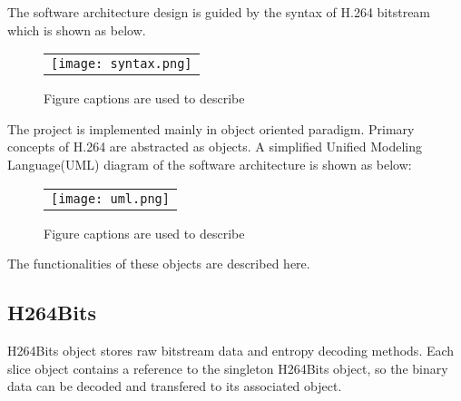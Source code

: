 \documentclass[../main.tex]{subfiles}
\begin{document}
The software architecture design is guided by the syntax of H.264 bitstream which is shown as below.

\begin{figure} [ht]
\begin{center}
\begin{tabular}{c} %
\texttt{[image: syntax.png]}
\end{tabular}
\end{center}
\caption[example] 
{ \label{fig:example} Figure captions are used to describe}
\end{figure} 

The project is implemented mainly in object oriented paradigm.
Primary concepts of H.264 are abstracted as objects.
A simplified Unified Modeling Language(UML) diagram of the software architecture is shown as below:

\begin{figure} [ht]
\begin{center}
\begin{tabular}{c} %
\texttt{[image: uml.png]}
\end{tabular}
\end{center}
\caption[example] 
{ \label{fig:example} Figure captions are used to describe}
\end{figure} 

The functionalities of these objects are described here.

\subsection{H264Bits}
H264Bits object stores raw bitstream data and entropy decoding methods.
Each slice object contains a reference to the singleton H264Bits object, 
so the binary data can be decoded and transfered to its associated object.

\end{document}
